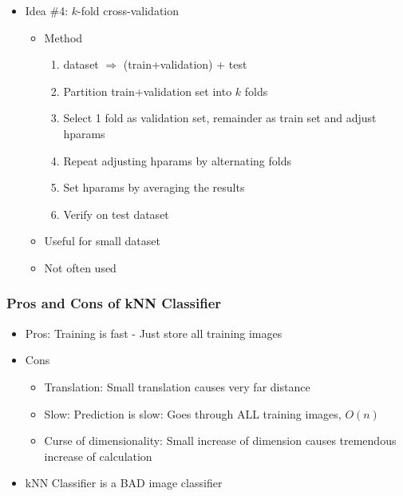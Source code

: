 \begin{itemize}
\begin{itemize}
    \end{itemize}
    \item Idea \#4: $k$-fold cross-validation
    \begin{itemize}
        \item Method
        \begin{enumerate}
            \item dataset $\Rightarrow$ (train+validation) + test
            \item Partition train+validation set into $k$ folds
            \item Select 1 fold as validation set, remainder as train set and adjust hparams
            \item Repeat adjusting hparams by alternating folds
            \item Set hparams by averaging the results
            \item Verify on test dataset
        \end{enumerate}
        \item Useful for small dataset
        \item Not often used
    \end{itemize}
\end{itemize}

\subsubsection*{Pros and Cons of kNN Classifier}
\begin{itemize}
    \item Pros: Training is fast - Just store all training images
    \item Cons
    \begin{itemize}
        \item Translation: Small translation causes very far distance
        \item Slow: Prediction is slow: Goes through ALL training images, $O(n)$
        \item Curse of dimensionality: Small increase of dimension causes tremendous increase of calculation
    \end{itemize}
    \item kNN Classifier is a BAD image classifier
\end{itemize}